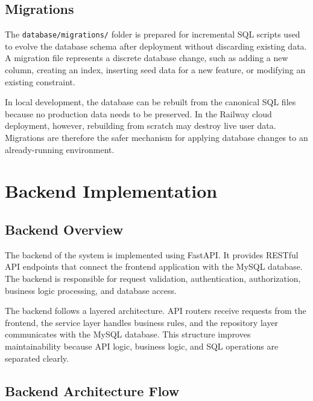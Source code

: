 \documentclass{article}
\begin{document}
\subsection{Migrations}

The \texttt{database/migrations/} folder is prepared for incremental SQL scripts used to evolve 
the database schema after deployment without discarding existing data. A migration file 
represents a discrete database change, such as adding a new column, creating an index, inserting 
seed data for a new feature, or modifying an existing constraint.

In local development, the database can be rebuilt from the canonical SQL files because no 
production data needs to be preserved. In the Railway cloud deployment, however, rebuilding 
from scratch may destroy live user data. Migrations are therefore the safer mechanism for 
applying database changes to an already-running environment.

\section{Backend Implementation}

\subsection{Backend Overview}

The backend of the system is implemented using FastAPI. It provides RESTful API endpoints that connect the frontend application with the MySQL database. The backend is responsible for request validation, authentication, authorization, business logic processing, and database access.

The backend follows a layered architecture. API routers receive requests from the frontend, the service layer handles business rules, and the repository layer communicates with the MySQL database. This structure improves maintainability because API logic, business logic, and SQL operations are separated clearly.

\subsection{Backend Architecture Flow}
\end{document}
